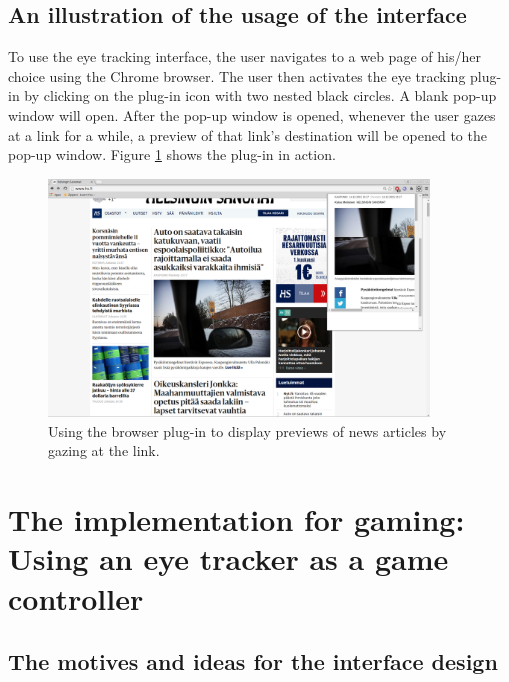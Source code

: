 \documentclass[english]{tktltiki}
\begin{document}
\subsection{An illustration of the usage of the interface}

To use the eye tracking interface, the user navigates to a web page of his/her choice using the Chrome browser. The user then activates the eye tracking plug-in by clicking on the plug-in icon with two nested black circles. A blank pop-up window will open. After the pop-up window is opened, whenever the user gazes at a link for a while, a preview of that link's destination will be opened to the pop-up window. Figure \ref{pluginusage} shows the plug-in in action.

\begin{figure}[h]
\begin{center}
\includegraphics[width=0.9\textwidth]{browser_plugin.png}
\caption{Using the browser plug-in to display previews of news articles by gazing at the link.}
\label{pluginusage}
\end{center}
\end{figure}



\section{The implementation for gaming: Using an eye tracker as a game controller}


\subsection{The motives and ideas for the interface design}
\end{document}
